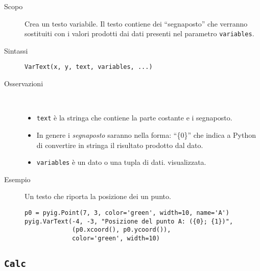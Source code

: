 \begin{description}
 \item [Scopo] Crea un testo variabile. 
 Il testo contiene dei ``segnaposto'' che verranno sostituiti con i valori 
prodotti dai dati presenti nel parametro \lstinline{variables}.
 \item [Sintassi] \lstinline{VarText(x, y, text, variables, ...)}
 \item [Osservazioni] ~\\
\begin{itemize} [nosep]
\item \lstinline{text} è la stringa che contiene la parte costante e i 
segnaposto.
\item In genere i \emph{segnaposto} saranno nella forma: ``\{0\}'' che indica a 
Python di convertire in stringa il risultato prodotto dal dato.
\item \lstinline{variables} è un dato o una tupla di dati.
visualizzata.
\end{itemize}

 \item [Esempio] Un testo che riporta la posizione dei un punto.

\begin{lstlisting}
p0 = pyig.Point(7, 3, color='green', width=10, name='A')
pyig.VarText(-4, -3, "Posizione del punto A: ({0}; {1})",
             (p0.xcoord(), p0.ycoord()),
             color='green', width=10)
\end{lstlisting}

\end{description}


\subsection{\lstinline{Calc}}
\label{sub:geoint_calc}

